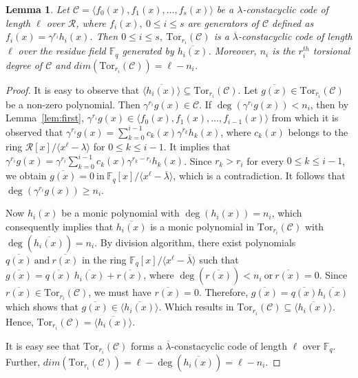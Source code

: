 \documentclass[12pt,a4paper]{article}
\newtheorem{lemma}[theorem]{Lemma}
\begin{document}
\begin{lemma}\label{lem:torsion}
    Let $\mathcal{C}= \langle f_0(x),f_1(x), \dots , f_s(x) \rangle $ be a $\lambda$-constacyclic code of length $\ell$ over $\mathcal{R}$, where $f_i(x),~0 \le i \le s$ are generators of $\mathcal{C}$ defined as $f_i(x)=\gamma^{r_i}h_i(x)$. Then  $0 \le i \le s,~\mathrm{Tor}_{r_i}(\mathcal{C})$ is a $\overline{\lambda}$-constacyclic code of length $\ell$ over the residue field $\mathbb{F}_q$ generated by $\overline{h_i(x)}$. Moreover, $n_i$ is the $r_i^{th}$ torsional degree of $\mathcal{C}$ and $dim(\mathrm{Tor}_{r_i}(\mathcal{C}))=\ell-n_i$.
\end{lemma}
\begin{proof}
    It is easy to observe that $\langle \overline{h_i(x)} \rangle \subseteq \mathrm{Tor}_{r_i}(\mathcal{C})$. Let $\overline{g(x)} \in \mathrm{Tor}_{r_i}(\mathcal{C})$ be a non-zero polynomial. Then $\gamma^{r_i}g(x) \in \mathcal{C}$. If $\deg(\gamma^{r_i}g(x))<n_i$, then by Lemma~\ref{lem:first}, $\gamma^{r_i}g(x) \in \langle f_0(x),f_1(x),\dots,f_{i-1}(x) \rangle$ from which it is observed that $\gamma^{r_i}g(x)= \sum_{k=0}^{i-1}c_k(x)\gamma^{r_k}h_k(x)$, where $c_k(x)$ belongs to the ring $\mathcal{R}[x]/\langle x^{\ell}-\lambda \rangle$ for $0\le k \le i-1$. It implies that $\gamma^{r_i}g(x)= \gamma^{r_i}\sum_{k=0}^{i-1}c_k(x)\gamma^{r_k-r_i}h_k(x)$. Since $r_k>r_i$ for every $0\le k \le i-1$, we obtain $\overline{g(x)}=0 ~\text{in}~ \mathbb{F}_q[x]/\langle x^{\ell}- \overline{\lambda} \rangle$, which is a contradiction. It follows that $\deg(\gamma^{r_i}g(x)) \ge n_i$.
    
    Now $h_i(x)$ be a monic polynomial with $\deg(h_i(x))=n_i$, which consequently implies that $\overline{h_i(x)}$ is a monic polynomial in $\mathrm{Tor}_{r_i}(\mathcal{C})$ with $\deg(\overline{h_i(x)})=n_i$. By division algorithm, there exist polynomials $\overline{q(x)} ~\text{and}~ \overline{r(x)}$ in the ring $\mathbb{F}_q[x]/\langle x^{\ell}- \overline{\lambda} \rangle$ such that $\overline{g(x)}=\overline{q(x)}~\overline{h_i(x)}+\overline{r(x)}$, where $\deg(\overline{r(x)}) < n_i~\text{or}~\overline{r(x)}=0$. Since $\overline{r(x)} \in \mathrm{Tor}_{r_i}(\mathcal{C})$, we must have $\overline{r(x)}=0$. Therefore, $\overline{g(x)}=\overline{q(x)}\overline{h_i(x)}$ which shows that $\overline{g(x)}\in \langle \overline{h_i(x)} \rangle$. Which results in $\mathrm{Tor}_{r_i}(\mathcal{C}) \subseteq \langle \overline{h_i(x)} \rangle$. Hence, $\mathrm{Tor}_{r_i}(\mathcal{C})= \langle \overline{h_i(x)} \rangle$.

    It is easy see that $\mathrm{Tor}_{r_i}(\mathcal{C})$ forms a $\overline{\lambda}$-constacyclic code of length $\ell$ over $\mathbb{F}_q$. Further, $dim(\mathrm{Tor}_{r_i}(\mathcal{C}))=\ell-\deg(\overline{h_i(x)})=\ell-n_i$.
\end{proof}
\end{document}
